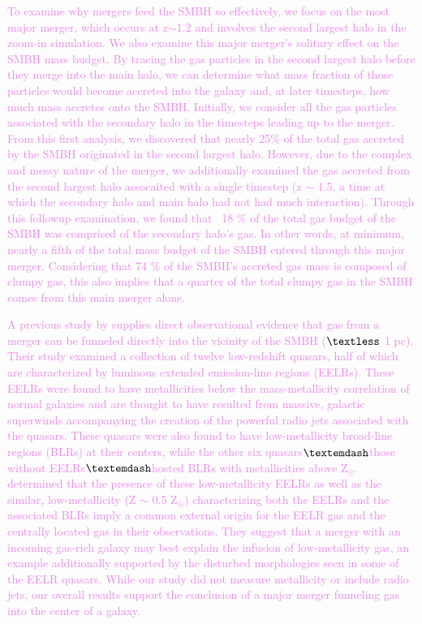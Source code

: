 \documentclass[manuscript]{aastex}
\begin{document}
\textcolor{violet}{
To examine why mergers feed the SMBH so effectively, we focus on the most major merger, which occurs at z$\sim$1.2 and involves the second largest halo in the zoom-in simulation. We also examine this major merger's solitary effect on the SMBH mass budget. By tracing the gas particles in the second largest halo before they merge into the main halo, we can determine what mass fraction of those particles would become accreted into the galaxy and, at later timesteps, how much mass accretes onto the SMBH. Initially, we consider all the gas particles associated with the secondary halo in the timesteps leading up to the merger. From this first analysis, we discovered that nearly 25$\%$ of the total gas accreted by the SMBH originated in the second largest halo. However, due to the complex and messy nature of the merger, we additionally examined the gas accreted from the second largest halo assocaited with a single timestep (z $\sim$ 1.5, a time at which the secondary halo and main halo had not had much interaction). Through this followup examination, we found that ~18 $\%$ of the total gas budget of the SMBH was comprised of the secondary halo's gas. In other words, at minimum, nearly a fifth of the total mass budget of the SMBH entered through this major merger. Considering that 74 $\%$ of the SMBH's accreted gas mass is composed of clumpy gas, this also implies that a quarter of the total clumpy gas in the SMBH comes from this main merger alone. 
}

\textcolor{violet}{
A previous study by \cite{Fu2007} supplies direct observational evidence that gas from a merger can be funneled directly into the vicinity of the SMBH ($\textless$ 1 pc). Their study examined a collection of twelve low-redshift quasars, half of which are characterized by luminous extended emission-line regions (EELRs). These EELRs were found to have metallicities below the mass-metallicity correlation of normal galaxies and are thought to have resulted from massive, galactic superwinds accompanying the creation of the powerful radio jets associated with the quasars. These quasars were also found to have low-metallicity broad-line regions (BLRs) at their centers, while the other six quasars$\textemdash$those without EELRs$\textemdash$hosted BLRs with metallicities above Z$_{\odot}$. \cite{Fu2007} determined that the presence of these low-metallicity EELRs as well as the similar, low-metallicity (Z $\sim$ 0.5 Z$_{\odot}$) characterizing both the EELRs and the associated BLRs imply a common external origin for the EELR gas and the centrally located gas in their observations. They suggest that a merger with an incoming gas-rich galaxy may best explain the infusion of low-metallicity gas, an example additionally supported by the disturbed morphologies seen in some of the EELR quasars. While our study did not measure metallicity or include radio jets, our overall results support the conclusion of a major merger funneling gas into the center of a galaxy. 
}
\end{document}
